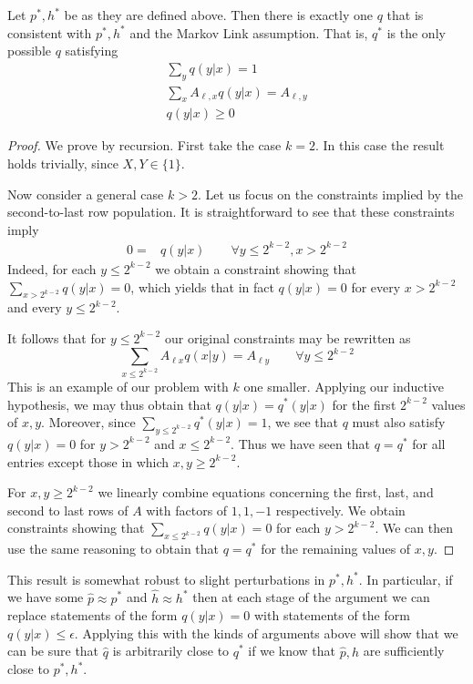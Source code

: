 \begin{thm}\label{thm:miracle}
Let $p^*,h^*$ be as they are defined above.  Then there is exactly one $q$ that is consistent with $p^*,h^*$ and the Markov Link assumption.  That is, $q^*$ is the only possible $q$ satisfying
\begin{gather*}
\sum_y q(y|x)=1 \\
\sum_x A_{\ell,x}q(y|x)=A_{\ell,y}\\
q(y|x)\geq 0
\end{gather*}
\end{thm} 
\begin{proof}
We prove by recursion.  First take the case $k=2$.  In this case the result holds trivially, since $X,Y\in\{1\}$.

Now consider a general case $k>2$.  Let us focus on the constraints implied by the second-to-last row population.  It is straightforward to see that these constraints imply
\begin{align*}
0=&q(y|x) \qquad \forall y\leq 2^{k-2},x>2^{k-2}
\end{align*}
Indeed, for each $y\leq 2^{k-2}$ we obtain a constraint showing that $\sum_{x>2^{k-2}}q(y|x)=0$, which yields that in fact $q(y|x)=0$ for every $x>2^{k-2}$ and every $y\leq 2^{k-2}$.

It follows that for $y\leq 2^{k-2}$ our original constraints may be rewritten as
\[
\sum_{x\leq2^{k-2}} A_{\ell x} q(x|y) = A_{\ell y} \qquad \forall y\leq 2^{k-2}
\]
This is an example of our problem with $k$ one smaller.  Applying our inductive hypothesis, we may thus obtain that $q(y|x)=q^*(y|x)$ for the first $2^{k-2}$ values of $x,y$.  Moreover, since $\sum_{y\leq 2^{k-2}} q^*(y|x)=1$, we see that $q$ must also satisfy $q(y|x)=0$ for $y>2^{k-2}$ and $x\leq 2^{k-2}$.  Thus we have seen that $q=q^*$ for all entries except those in which $x,y\geq 2^{k-2}$.

For $x,y \geq2^{k-2}$ we linearly combine equations concerning the first, last, and second to last rows of $A$ with factors of $1,1,-1$ respectively.  We obtain constraints showing that $\sum_{x\leq2^{k-2}}q(y|x)=0$ for each $y>2^{k-2}$.  We can then use the same reasoning to obtain that $q=q^*$ for the remaining values of $x,y$.
\end{proof}

This result is somewhat robust to slight perturbations in $p^*,h^*$.  In particular, if we have some $\hat p\approx p^*$ and $\hat h\approx h^*$ then at each stage of the argument we can replace statements of the form $q(y|x)=0$ with statements of the form $q(y|x)\leq \epsilon$.  Applying this with the kinds of arguments above will show that we can be sure that $\hat q$ is arbitrarily close to $q^*$ if we know that $\hat p,\hat h$ are sufficiently close to $p^*,h^*$.  

